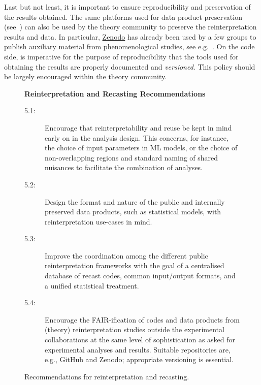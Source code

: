 \documentclass[11pt]{article}
\begin{document}
Last but not least, it is important to ensure reproducibility and  preservation of the results obtained.
The same platforms used for \gls{data product} preservation (see~) can also be used by the theory community to preserve the reinterpretation results and data.
In particular, \href{https://zenodo.org/}{Zenodo} has already been used by a few groups to publish auxiliary material from phenomenological studies, see e.g.~\cite{zenodo:LHCreinterpretation,zenodo:gambit}.
On the code side, is imperative for the purpose of reproducibility that the tools used for obtaining the results are properly documented and \emph{versioned}.
This policy should be largely encouraged within the theory community.\\

\begin{figure}[!ht]
\begin{tcolorbox}
\begin{center}
{\large \textbf{Reinterpretation and Recasting Recommendations}}
\end{center}
%
\begin{description}
    \item[5.1:] Encourage that reinterpretability and reuse be kept in mind early on in the analysis design. This concerns, for instance, the choice of input parameters in \gls{ML} models, or the choice of non-overlapping regions and standard naming of shared nuisances to facilitate the combination of analyses.
    \item[5.2:] Design the format and nature of the public and internally preserved \glspl{data product}, such as statistical models, with reinterpretation use-cases in mind.
    \item[5.3:] Improve the coordination among the different public reinterpretation frameworks  with the goal of a centralised database of recast codes, common input/output formats, and a unified statistical treatment.
    \item[5.4:] Encourage the \gls{FAIR}-ification of codes and \glspl{data product} from (theory) reinterpretation studies outside the experimental collaborations at the same level of sophistication as asked for experimental analyses and results. Suitable repositories are, e.g., GitHub and Zenodo; appropriate versioning is essential.
\end{description}
\end{tcolorbox}
\caption{Recommendations for reinterpretation and recasting.}
\label{fig:recs_reinterpretation}
\end{figure}
\end{document}
